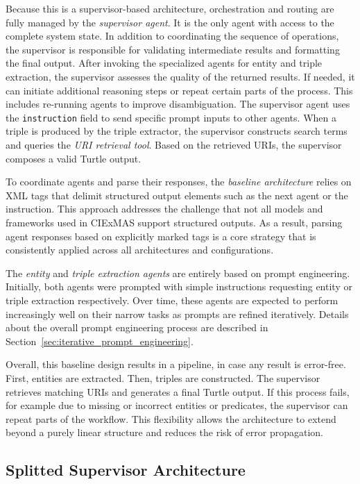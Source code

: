 \documentclass[a4paper,oneside,bibliography=totoc]{scrbook}
\begin{document}
Because this is a supervisor-based architecture, orchestration and routing are fully managed by the \textit{supervisor agent}. It is the only agent with access to the complete system state. In addition to coordinating the sequence of operations, the supervisor is responsible for validating intermediate results and formatting the final output. After invoking the specialized agents for entity and triple extraction, the supervisor assesses the quality of the returned results. If needed, it can initiate additional reasoning steps or repeat certain parts of the process. This includes re-running agents to improve disambiguation. The supervisor agent uses the \texttt{instruction} field to send specific prompt inputs to other agents. When a triple is produced by the triple extractor, the supervisor constructs search terms and queries the \textit{URI retrieval tool}. Based on the retrieved URIs, the supervisor composes a valid Turtle output.

To coordinate agents and parse their responses, the \textit{baseline architecture} relies on XML tags that delimit structured output elements such as the next agent or the instruction. This approach addresses the challenge that not all models and frameworks used in CIExMAS support structured outputs. As a result, parsing agent responses based on explicitly marked tags is a core strategy that is consistently applied across all architectures and configurations.

The \textit{entity} and \textit{triple extraction agents} are entirely based on prompt engineering. Initially, both agents were prompted with simple instructions requesting entity or triple extraction respectively. Over time, these agents are expected to perform increasingly well on their narrow tasks as prompts are refined iteratively. Details about the overall prompt engineering process are described in Section~\ref{sec:iterative_prompt_engineering}.

Overall, this baseline design results in a pipeline, in case any result is error-free. First, entities are extracted. Then, triples are constructed. The supervisor retrieves matching URIs and generates a final Turtle output. If this process fails, for example due to missing or incorrect entities or predicates, the supervisor can repeat parts of the workflow. This flexibility allows the architecture to extend beyond a purely linear structure and reduces the risk of error propagation.

\subsection{Splitted Supervisor Architecture}
\label{subsec:supervisor}
\end{document}
